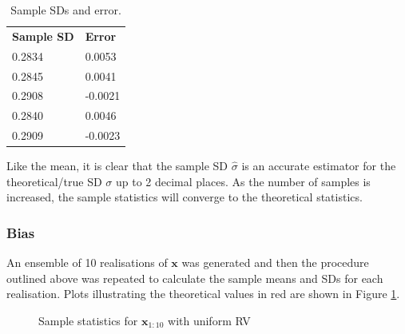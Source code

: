 \begin{table}[H]
\centering
\begin{tabular}{C{3cm} C{2cm}}
\Xhline{2\arrayrulewidth}
\textbf{Sample SD} & \textbf{Error} \\ \Xhline{2\arrayrulewidth}
0.2834 & 0.0053 \\ 
0.2845 & 0.0041 \\ 
0.2908 & -0.0021 \\ 
0.2840 & 0.0046 \\ 
0.2909 & -0.0023 \\ 
\hline
\end{tabular}
\caption{Sample SDs and error.}
\label{tab:uni_sd}
\end{table}

\noindent
Like the mean, it is clear that the sample SD $\hat{\sigma}$ is an accurate estimator for the theoretical/true SD $\sigma$ up to 2 decimal places. As the number of samples is increased, the sample statistics will converge to the theoretical statistics. 

\subsubsection{Bias}

An ensemble of 10 realisations of $\textbf{x}$ was generated and then the procedure outlined above was repeated to calculate the sample means and SDs for each realisation. Plots illustrating the theoretical values in red are shown in Figure \ref{fig:samplevals1}.

\begin{figure}[H]
    \centering
    \caption{Sample statistics for $\textbf{x}_{1:10}$ with uniform RV}
    \label{fig:samplevals1}
\end{figure}

